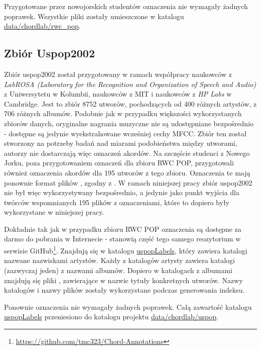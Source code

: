 Przygotowane przez nowojorskich studentów oznaczenia nie wymagały żadnych poprawek. Wszystkie pliki
 zostały umieszczone w katalogu \url{data/chordlab/rwc_pop}.

\subsection{Zbiór Uspop2002}

Zbiór uspop2002 \cite{berenzweig_large-scale_2004} został przygotowany w ramach współpracy naukowców
z \emph{LabROSA (Laboratory for the Recognition and Organization of Speech and Audio)} z
Uniwersytetu w Kolumbii, naukowców z MIT i naukowców z \emph{HP Labs} w Cambridge. Jest to zbiór
8752 utworów, pochodzących od 400 różnych artystów, z 706 różnych albumów. Podobnie jak w przypadku
większości wykorzystanych zbiorów danych, oryginalne nagrania muzyczne nie są udostępniane
bezpośrednio - dostępne są jedynie wyekstrahowane wcześniej cechy MFCC. Zbiór ten został stworzony
na potrzeby badań nad miarami podobieństwa między utworami, autorzy nie dostarczają więc oznaczeń
akordów. Na szczęście studenci z Nowego Jorku, poza przygotowaniem oznaczeń dla zbioru RWC POP,
przygotowali również oznaczenia akordów dla 195 utworów z tego zbioru. Oznaczenia te mają ponownie
format plików , zgodny z \cite{harte_towards_nodate}. W ramach niniejszej pracy zbiór
uspop2002 nie był więc wykorzystywany bezpośrednio, a jedynie jako punkt wyjścia dla twórców
wspomnianych 195 plików z oznaczeniami, które to dopiero były wykorzystane w niniejszej pracy.

Dokładnie tak jak w przypadku zbioru RWC POP oznaczenia są dostępne za darmo do pobrania w
Internecie - stanowią część tego samego reozytorium w serwisie
GitHub\footnote{\url{https://github.com/tmc323/Chord-Annotations}}. Znajdują się w katalogu
\url{uspopLabels}, który zawiera katalogi nazwane nazwiskami artystów. Każdy z katalogów artysty
zawiera katalogi (zazwyczaj jeden) z nazwami albumów. Dopiero w katalogach z albumami znajdują się
pliki , zawierające w nazwie tytuły konkretnych utworów. Nazwy katalogów i nazwy plików
zostały wykorzystane podczas generowania indeksu.

Ponownie oznaczenia nie wymagały żadnych poprawek. Całą zawartość katalogu \url{uspopLabels}
przeniesiono do katalogu projektu \url{data/chordlab/uspop}.

